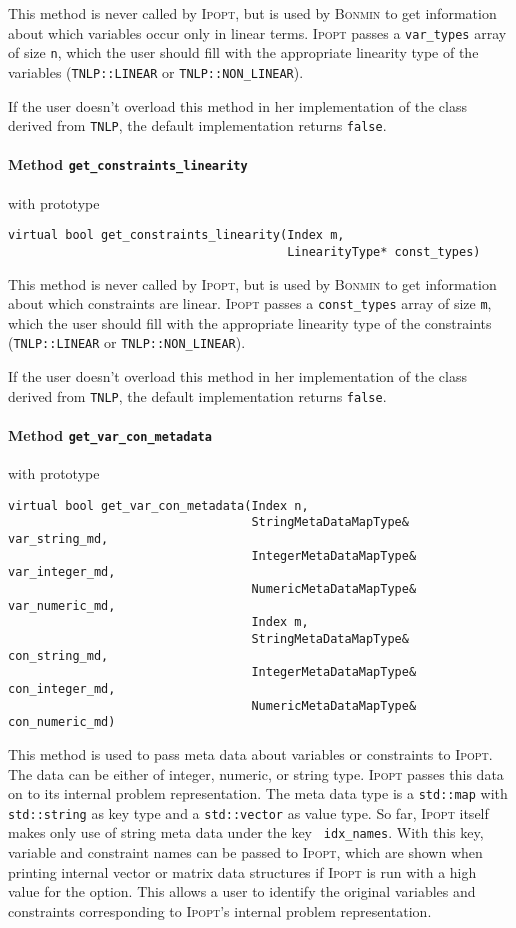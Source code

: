 \documentclass[10pt]{article}
\newcommand{\Ipopt}{\textsc{Ipopt}\xspace}
\begin{document}
This method is never called by \Ipopt, but is used by \textsc{Bonmin} to get information about which variables occur only in linear terms.
\Ipopt passes a {\tt var\_types} array of size {\tt n}, which the user should fill with the appropriate linearity type of the variables ({\tt TNLP::LINEAR} or {\tt TNLP::NON\_LINEAR}).

If the user doesn't overload this method in her implementation of the class derived from {\tt TNLP}, the default implementation returns {\tt false}.

\paragraph{Method \texttt{get\_constraints\_linearity}} with prototype
\begin{verbatim}
virtual bool get_constraints_linearity(Index m,
                                       LinearityType* const_types)
\end{verbatim}

This method is never called by \Ipopt, but is used by \textsc{Bonmin} to get information about which constraints are linear.
\Ipopt passes a {\tt const\_types} array of size {\tt m}, which the user should fill with the appropriate linearity type of the constraints ({\tt TNLP::LINEAR} or {\tt TNLP::NON\_LINEAR}).

If the user doesn't overload this method in her implementation of the class derived from {\tt TNLP}, the default implementation returns {\tt false}.

\paragraph{Method \texttt{get\_var\_con\_metadata}} with prototype
\begin{verbatim}
virtual bool get_var_con_metadata(Index n,
                                  StringMetaDataMapType& var_string_md,
                                  IntegerMetaDataMapType& var_integer_md,
                                  NumericMetaDataMapType& var_numeric_md,
                                  Index m,
                                  StringMetaDataMapType& con_string_md,
                                  IntegerMetaDataMapType& con_integer_md,
                                  NumericMetaDataMapType& con_numeric_md)
\end{verbatim}

This method is used to pass meta data about variables or constraints to 
\Ipopt. The data can be either of integer, numeric, or string type.
\Ipopt passes this data on to its internal problem representation.
The meta data type is a {\tt std::map} with {\tt std::string} as key type and 
a {\tt std::vector} as value type.
So far, \Ipopt itself makes only use of string meta data under the key {\tt 
idx\_names}. With this key, variable and constraint names can be passed to 
\Ipopt, which are shown when printing internal vector or matrix data structures 
if \Ipopt is run with a high value for the  
option. This allows a user to identify the original variables and constraints
corresponding to \Ipopt's internal problem representation.
\end{document}
